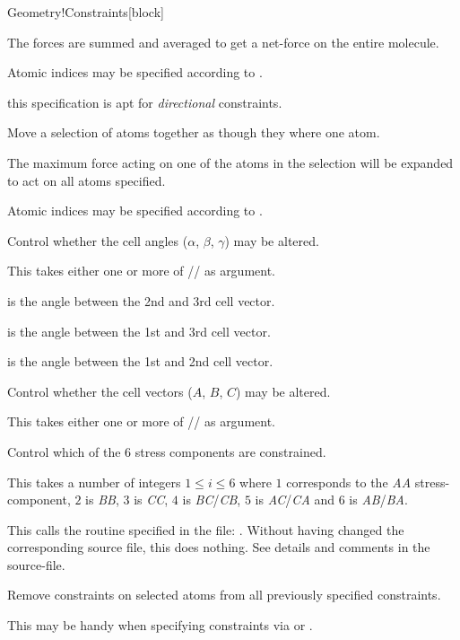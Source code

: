 \begin{fdfentry}{Geometry!Constraints}[block]
\begin{fdfoptions}
    The forces are summed and averaged to get a net-force on the
    entire molecule.

    Atomic indices may be specified according to .

    \note this specification is apt for \emph{directional}
    constraints. 


    Move a selection of atoms together as though they where one atom.

    The maximum force acting on one of the atoms in the selection will
    be expanded to act on all atoms specified.

    Atomic indices may be specified according to .



    Control whether the cell angles ($\alpha$, $\beta$, $\gamma$) may
    be altered.

    This takes either one or more of
    // as argument.

     is the angle between the 2nd and 3rd cell vector.

     is the angle between the 1st and 3rd cell vector. 

     is the angle between the 1st and 2nd cell vector. 

    Control whether the cell vectors ($A$, $B$, $C$) may be altered.

    This takes either one or more of // as
    argument.

    \option[stress]%
    Control which of the 6 stress components are constrained.

    This takes a number of integers $1\le i\le6$ where $1$ corresponds
    to the \emph{AA} stress-component, $2$ is \emph{BB}, $3$ is
    \emph{CC}, $4$ is \emph{BC}/\emph{CB}, $5$ is \emph{AC}/\emph{CA}
    and $6$ is \emph{AB}/\emph{BA}.

    \option[routine]%
    This calls the  routine specified in the file:
    . Without having changed the corresponding source
    file, this does nothing.
    See details and comments in the source-file.


    \option[clear]%
    Remove constraints on selected atoms from all previously specified
    constraints.

    This may be handy when specifying constraints via  or
    .


\end{fdfoptions}
\end{fdfentry}

